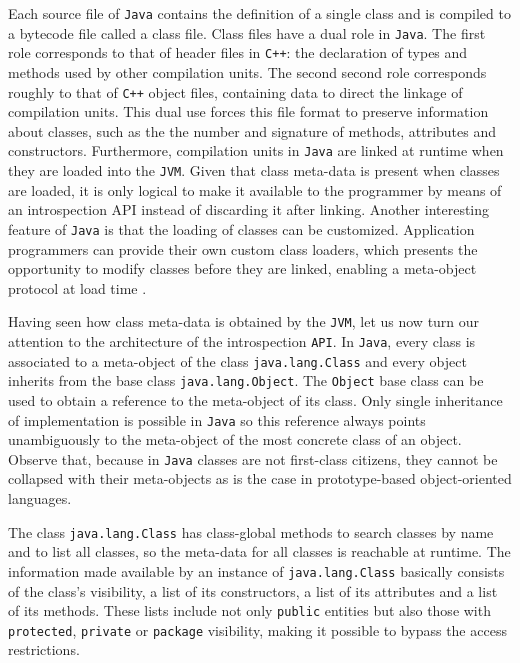 Each source file of \texttt{Java} contains the definition of a single class and is compiled to a bytecode file called a class file.
Class files have a dual role in \texttt{Java}. The first role corresponds to that of header files in \texttt{C++}: the
declaration of types and methods used by other compilation units. The second second role corresponds roughly to that of
\texttt{C++} object files, containing data to direct the linkage of compilation units. This dual use forces this file format to
preserve information about classes, such as the the number and signature of methods, attributes and constructors.
Furthermore, compilation units in \texttt{Java} are linked at runtime when they are loaded into the \texttt{JVM}. Given that
class meta-data is present when classes are loaded, it is only logical to make it available to the programmer by means
of an introspection API instead of discarding it after linking. Another interesting feature of \texttt{Java} is that the loading
of classes can be customized. Application programmers can provide their own custom class loaders, which presents the
opportunity to modify classes before they are linked, enabling a meta-object protocol at load time \cite{Chiba2000}.

Having seen how class meta-data is obtained by the \texttt{JVM}, let us now turn our attention to the architecture of the
introspection \texttt{API}. In \texttt{Java}, every class is associated to a meta-object of the class \texttt{java.lang.Class} and every object
inherits from the base class \texttt{java.lang.Object}. The \texttt{Object} base class can be used to obtain a reference to the meta-object of
its class. Only single inheritance of implementation is possible in \texttt{Java} so this reference always points unambiguously to the
meta-object of the most concrete class of an object. Observe that, because in \texttt{Java} classes are not first-class citizens, they
cannot be collapsed with their meta-objects as is the case in prototype-based object-oriented languages.

The class \texttt{java.lang.Class} has class-global methods to search classes by name and to list all classes, so the meta-data for all
classes is reachable at runtime. The information made available by an instance of \texttt{java.lang.Class} basically consists of the
class's visibility, a list of its constructors, a list of its attributes and a list of its methods. These lists include not only
\texttt{public} entities but also those with \texttt{protected}, \texttt{private} or \texttt{package} visibility, making it
possible to bypass the access restrictions.


